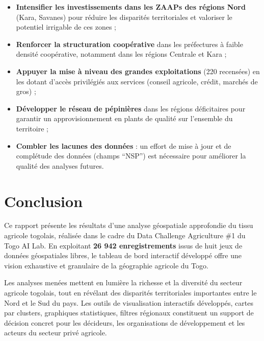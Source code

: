 \documentclass[12pt, a4paper]{article}
\begin{document}
\begin{itemize}[leftmargin=1.5em]
    \item \textbf{Intensifier les investissements dans les ZAAPs des régions Nord} (Kara, Savanes)
          pour réduire les disparités territoriales et valoriser le potentiel irrigable de ces zones ;

    \item \textbf{Renforcer la structuration coopérative} dans les préfectures à faible densité
          coopérative, notamment dans les régions Centrale et Kara ;

    \item \textbf{Appuyer la mise à niveau des grandes exploitations} (220 recensées) en les dotant
          d'accès privilégiés aux services (conseil agricole, crédit, marchés de gros) ;

    \item \textbf{Développer le réseau de pépinières} dans les régions déficitaires pour garantir
          un approvisionnement en plants de qualité sur l'ensemble du territoire ;

    \item \textbf{Combler les lacunes des données} : un effort de mise à jour et de complétude
          des données (champs ``NSP'') est nécessaire pour améliorer la qualité des analyses futures.
\end{itemize}

\section{Conclusion}

Ce rapport présente les résultats d'une analyse géospatiale approfondie du tissu agricole togolais,
réalisée dans le cadre du Data Challenge Agriculture \#1 du Togo AI Lab. En exploitant
\textbf{26 942 enregistrements} issus de huit jeux de données géospatiales libres, le tableau de
bord interactif développé offre une vision exhaustive et granulaire de la géographie agricole
du Togo.

Les analyses menées mettent en lumière la richesse et la diversité du secteur agricole togolais,
tout en révélant des disparités territoriales importantes entre le Nord et le Sud du pays. Les
outils de visualisation interactifs développés, cartes par clusters, graphiques statistiques,
filtres régionaux  constituent un support de décision concret pour les décideurs, les
organisations de développement et les acteurs du secteur privé agricole.
\end{document}
